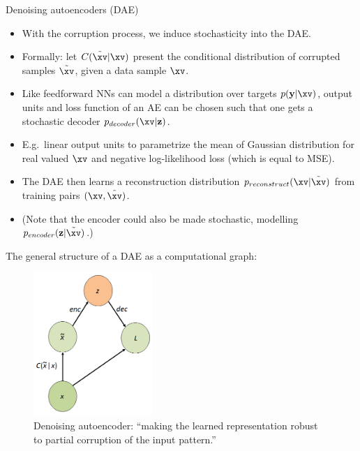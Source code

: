\begin{vbframe}{Denoising autoencoders (DAE)}
  \begin{itemize}
    \item %
    With the  corruption process, we induce stochasticity  into the DAE.
    \item Formally: let $C(\tilde{\xv}|\xv)$ present the conditional distribution of corrupted samples $\tilde{\xv}$, given a data sample $\xv$.
    \item  Like feedforward NNs can model a distribution over targets $p(\mathbf{y}|\xv)$, output units and loss function of an AE can be chosen such that one gets a stochastic decoder $p_{decoder}(\xv|\mathbf{z})$.
    \item E.g.~linear output units to parametrize the mean of Gaussian distribution for real valued $\xv$ and negative log-likelihood loss (which is equal to MSE).
    \item The DAE then learns a  reconstruction distribution $p_{reconstruct}(\xv|\tilde{\xv})$ from training pairs $(\xv, \tilde{\xv})$.
  \item (Note that the encoder could also be made stochastic, modelling $p_{encoder}(\mathbf{z}|\tilde{\xv})$.)
  \end{itemize}
\framebreak
  The general structure of a DAE as a computational graph:
  \begin{figure}
    \centering
    \includegraphics[width=4.5cm]{plots/denoising_autoencoder_basic_structure.png}
    \caption{Denoising autoencoder: \enquote{making the learned representation
robust to partial corruption of the input pattern.}}
  \end{figure}

\end{vbframe}
